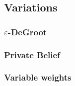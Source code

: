 \documentclass{article}
\begin{document}
\subsection{Variations}
\subsubsection{$\varepsilon$-DeGroot}
\subsubsection{Private Belief}
\subsubsection{Variable weights}

\newpage





\end{document}

